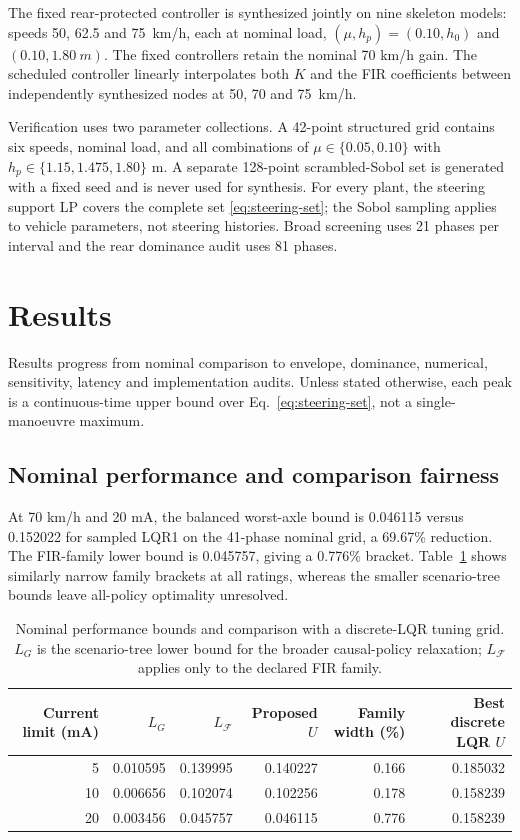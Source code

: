 \documentclass[fleqn,final,5p,times]{elsarticle}
\begin{document}
The fixed rear-protected controller is synthesized jointly on nine skeleton models: speeds 50, 62.5 and \SI{75}{km/h}, each at nominal load, $(\mu,h_p)=(0.10,h_0)$ and $(0.10,\SI{1.80}{m})$. The fixed controllers retain the nominal 70 km/h gain. The scheduled controller linearly interpolates both $K$ and the FIR coefficients between independently synthesized nodes at 50, 70 and \SI{75}{km/h}.

Verification uses two parameter collections. A 42-point structured grid contains six speeds, nominal load, and all combinations of $\mu\in\{0.05,0.10\}$ with $h_p\in\{1.15,1.475,1.80\}$ m. A separate 128-point scrambled-Sobol set \cite{sobol1967,owen1998} is generated with a fixed seed and is never used for synthesis. For every plant, the steering support LP covers the complete set \eqref{eq:steering-set}; the Sobol sampling applies to vehicle parameters, not steering histories. Broad screening uses 21 phases per interval and the rear dominance audit uses 81 phases.

\section{Results}
\label{sec:results}

Results progress from nominal comparison to envelope, dominance, numerical, sensitivity, latency and implementation audits. Unless stated otherwise, each peak is a continuous-time upper bound over Eq.~\eqref{eq:steering-set}, not a single-manoeuvre maximum.

\subsection{Nominal performance and comparison fairness}

At 70 km/h and 20 mA, the balanced worst-axle bound is 0.046115 versus 0.152022 for sampled LQR1 on the 41-phase nominal grid, a 69.67\% reduction. The FIR-family lower bound is 0.045757, giving a 0.776\% bracket. Table~\ref{tab:authority-brackets} shows similarly narrow family brackets at all ratings, whereas the smaller scenario-tree bounds leave all-policy optimality unresolved.

\begin{table}[!t]
\centering
\caption{Nominal performance bounds and comparison with a discrete-LQR tuning grid. $L_G$ is the scenario-tree lower bound for the broader causal-policy relaxation; $L_{\mathcal F}$ applies only to the declared FIR family.}
\label{tab:authority-brackets}
\begin{tabular}{rrrrrr}
\toprule
Current limit (mA) & $L_G$ & $L_{\mathcal F}$ & Proposed $U$ & Family width (\%) & Best discrete LQR $U$\\
\midrule
5  & 0.010595 & 0.139995 & 0.140227 & 0.166 & 0.185032\\
10 & 0.006656 & 0.102074 & 0.102256 & 0.178 & 0.158239\\
20 & 0.003456 & 0.045757 & 0.046115 & 0.776 & 0.158239\\
\bottomrule
\end{tabular}
\end{table}
\end{document}
